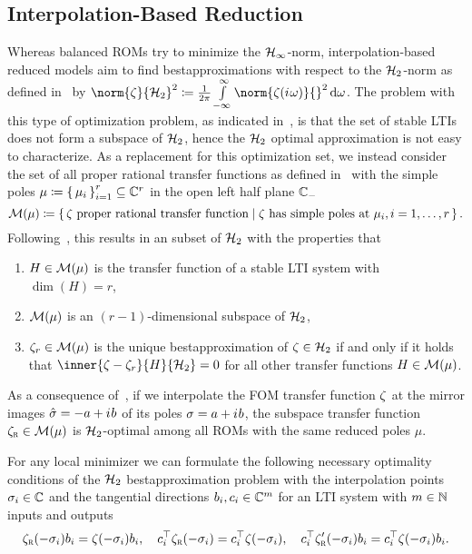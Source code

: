 \subsection{Interpolation-Based Reduction}\label{subsec:interpolation-reduction}

Whereas balanced \acp{ROM} try to minimize the $\mathcal{H}_\infty$-norm, interpolation-based reduced models aim to find bestapproximations with respect to the $\mathcal{H}_2$-norm as defined in~\cite[Section~3]{Gugercin2008} by $\norm{\tfunc}{\mcl{H}_2}^2 \coloneqq \frac{1}{2 \pi} \int\limits_{- \infty}^\infty \norm{\tfunc(\iu \omega)}{}^2 \dif \omega$.
The problem with this type of optimization problem, as indicated in~\cite[Section~3.1]{Gugercin2008}, is that the set of stable \acp{LTI} does not form a subspace of $\mathcal{H}_2$, hence the $\mathcal{H}_2$ optimal approximation is not easy to characterize.
As a replacement for this optimization set, we instead consider the set of all proper rational transfer functions as defined in~\cite[Section~1.3.1]{Corless2003} with the simple poles $\mu \coloneqq {\left\{\,\mu_i\,\right\}}_{i = 1}^r \subseteq \mathbb{C}^r$ in the open left half plane $\mathbb{C}_{-}$
\begin{equation*}
    \mathcal{M}(\mu) \coloneqq \left\{\,\zeta \text{ proper rational transfer function}\mid\zeta \text{ has simple poles at } \mu_i, i = 1, \dots, r\,\right\}.
\end{equation*}
Following~\cite[Theorem~3.1]{Gugercin2008}, this results in an subset of $\mathcal{H}_2$ with the properties that
\begin{enumerate}
    \item $H \in \mathcal{M}(\mu)$ is the transfer function of a stable \ac{LTI} system with $\dim{(H)} = r$,
    \item $\mathcal{M}(\mu)$ is an $(r - 1)$-dimensional subspace of $\mathcal{H}_2$,
    \item $\zeta_r \in \mathcal{M}(\mu)$ is the unique bestapproximation of $\zeta \in \mathcal{H}_2$ if and only if it holds that $\inner{\tfunc - \tfunc_r}{H}{\mcl{H}_2} = 0$ for all other transfer functions $H \in \mathcal{M}(\mu)$.
\end{enumerate}
As a consequence of~\cite[Theorem~3.1]{Gugercin2008}, if we interpolate the \ac{FOM} transfer function $\zeta$ at the mirror images $\hat{\sigma} = -a + {i\mkern1mu} b$ of its poles $\sigma = a + {i\mkern1mu} b$, the subspace transfer function $\zeta_{\textnormal{\scshape r}} \in \mathcal{M}(\mu)$ is $\mathcal{H}_2$-optimal among all \acp{ROM} with the same reduced poles $\mu$.

For any local minimizer we can formulate the following necessary optimality conditions of the $\mathcal{H}_2$ bestapproximation problem with the interpolation points $\sigma_i \in \mathbb{C}$ and the tangential directions $b_i, c_i \in \mathbb{C}^{m}$ for an \ac{LTI} system with $m \in \mathbb{N}$ inputs and outputs
\begin{equation}\label{eq:h2-optimality-conditions}
    \zeta_{\textnormal{\scshape r}}(- \sigma_i) b_i = \zeta(- \sigma_i) b_i,\quad c_i^{\top} \zeta_{\textnormal{\scshape r}}(- \sigma_i) = c_i^{\top} \zeta(- \sigma_i),\quad c_i^{\top} \zeta'_{\textnormal{\scshape r}}(- \sigma_i) b_i = c_i^{\top} \zeta(- \sigma_i) b_i.
\end{equation}

